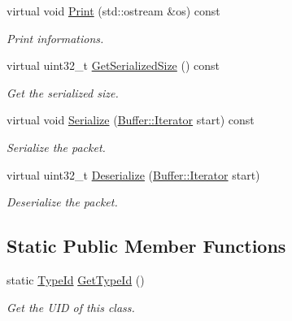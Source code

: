 \begin{DoxyCompactItemize}
virtual void \hyperlink{classns3_1_1Icmpv6TooBig_a63ccfb51098f1d209e22ea4d89e02b2f}{Print} (std\+::ostream \&os) const 
\begin{DoxyCompactList}\small\item\em Print informations. \end{DoxyCompactList}\item 
virtual uint32\+\_\+t \hyperlink{classns3_1_1Icmpv6TooBig_a4cfe017439e4d25c56d503a276b1efa0}{Get\+Serialized\+Size} () const 
\begin{DoxyCompactList}\small\item\em Get the serialized size. \end{DoxyCompactList}\item 
virtual void \hyperlink{classns3_1_1Icmpv6TooBig_ae8042b6593cfb81dad23e60c588e7b21}{Serialize} (\hyperlink{classns3_1_1Buffer_1_1Iterator}{Buffer\+::\+Iterator} start) const 
\begin{DoxyCompactList}\small\item\em Serialize the packet. \end{DoxyCompactList}\item 
virtual uint32\+\_\+t \hyperlink{classns3_1_1Icmpv6TooBig_a2d0f077afd744d980a93fee1b5df93a4}{Deserialize} (\hyperlink{classns3_1_1Buffer_1_1Iterator}{Buffer\+::\+Iterator} start)
\begin{DoxyCompactList}\small\item\em Deserialize the packet. \end{DoxyCompactList}\end{DoxyCompactItemize}
\subsection*{Static Public Member Functions}
\begin{DoxyCompactItemize}
\item 
static \hyperlink{classns3_1_1TypeId}{Type\+Id} \hyperlink{classns3_1_1Icmpv6TooBig_a010e5c49df54f4c314d590c384b69e18}{Get\+Type\+Id} ()
\begin{DoxyCompactList}\small\item\em Get the U\+ID of this class. \end{DoxyCompactList}\end{DoxyCompactItemize}
